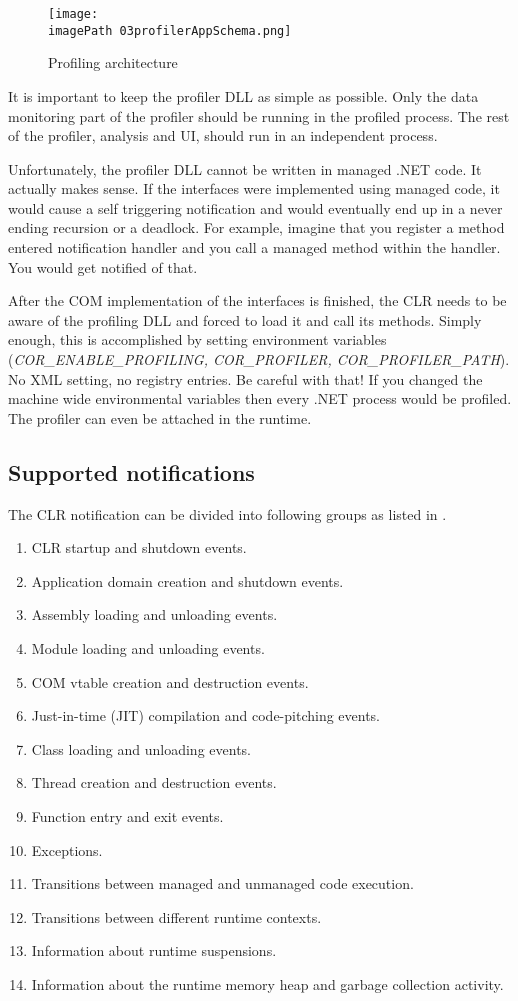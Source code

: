 \begin{figure}
	\centering
		\texttt{[image: \\imagePath 03profilerAppSchema.png]}
		\caption{Profiling architecture \cite{ProfMSDN} }
	\label{fig:03profilerAppSchema}
\end{figure}

It is important to keep the profiler DLL as simple as possible. Only the data monitoring part of the profiler should be running in the profiled process. The rest of the profiler, analysis and UI, should run in an independent process.

Unfortunately, the profiler DLL cannot be written in managed .NET code. It actually makes sense. If the interfaces were implemented using managed code, it would cause a self triggering notification and would eventually end up in a never ending recursion or a deadlock. For example, imagine that you register a method entered notification handler and you call a managed method within the handler. You would get notified of that.

After the COM implementation of the interfaces is finished, the CLR needs to be aware of the profiling DLL and forced to load it and call its methods. Simply enough, this is accomplished by setting
 environment variables (\textit{COR\_ENABLE\_PROFILING, COR\_PROFILER, COR\_PROFILER\_PATH}). No XML setting, no registry entries. Be careful with that! If you changed the machine wide environmental variables then every .NET process would be profiled. The profiler can even be attached in the runtime.

\subsection{Supported notifications}
The CLR notification can be divided into following groups as listed in \cite{ProfMSDN}.

\begin{enumerate}
\item CLR startup and shutdown events.
\item Application domain creation and shutdown events.
\item Assembly loading and unloading events.
\item Module loading and unloading events.
\item COM vtable creation and destruction events.
\item Just-in-time (JIT) compilation and code-pitching events.
\item Class loading and unloading events.
\item Thread creation and destruction events.
\item Function entry and exit events.
\item Exceptions.
\item Transitions between managed and unmanaged code execution.
\item Transitions between different runtime contexts.
\item Information about runtime suspensions.
\item Information about the runtime memory heap and garbage collection activity.
\end{enumerate}

